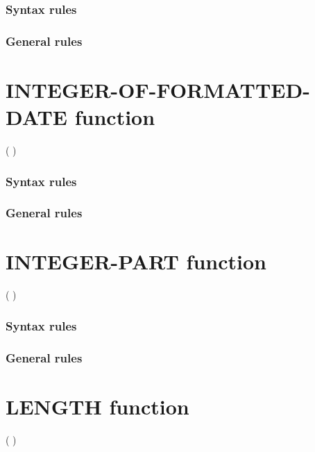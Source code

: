\subsubsection{Syntax rules}

\subsubsection{General rules}

\section{INTEGER-OF-FORMATTED-DATE function}

\begin{syntax}
    ( \argument \argument )
\end{syntax}

\subsubsection{Syntax rules}

\subsubsection{General rules}

\section{INTEGER-PART function}

\begin{syntax}
    ( \argument )
\end{syntax}

\subsubsection{Syntax rules}

\subsubsection{General rules}

\section{LENGTH function}

\begin{syntax}
    ( \argument
  )
\end{syntax}

